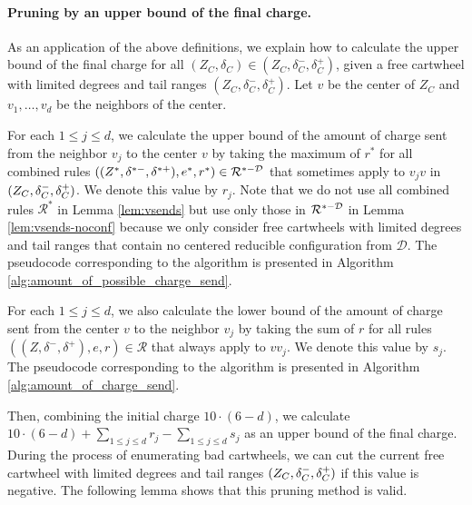 \documentclass[10pt,a4paper]{article}
\begin{document}
\paragraph{Pruning by an upper bound of the final charge.}
As an application of the above definitions, we explain how to calculate the upper bound of the final charge for all $(Z_C, \delta_C) \in (Z_C, \delta_C^-, \delta_C^+)$, given a free cartwheel with limited degrees and tail ranges $(Z_C, \delta_C^-, \delta_C^+)$.
Let $v$ be the center of $Z_C$ and $v_1, \ldots, v_d$ be the neighbors of the center.

For each $1 \leq j \leq d$, we calculate the upper bound of the amount of charge sent from the neighbor $v_j$ to the center $v$ by taking the maximum of $r^*$ for all combined rules $((Z^*, \delta^{*-}, \delta^{*+}), e^*, r^*) \in \mathcal{R}^{*-\mathcal{D}}$ that sometimes apply to $v_jv$ in $(Z_C, \delta_C^-, \delta_C^+)$.
We denote this value by $r_j$.
Note that we do not use all combined rules $\mathcal{R}^*$ in Lemma \ref{lem:vsends} but use only those in $\mathcal{R}^{*-\mathcal{D}}$ in Lemma \ref{lem:vsends-noconf} because we only consider free cartwheels with limited degrees and tail ranges that contain no centered reducible configuration from $\mathcal{D}$.
The pseudocode corresponding to the algorithm is presented in Algorithm \ref{alg:amount_of_possible_charge_send}.

For each $1 \leq j \leq d$, we also calculate the lower bound of the amount of charge sent from the center $v$ to the neighbor $v_j$ by taking the sum of $r$ for all rules $((Z, \delta^-, \delta^+), e, r) \in \mathcal{R}$ that always apply to $vv_j$.
We denote this value by $s_j$.
The pseudocode corresponding to the algorithm is presented in Algorithm \ref{alg:amount_of_charge_send}.

Then, combining the initial charge $10 \cdot (6-d)$, we calculate $10 \cdot (6-d) + \sum_{1 \leq j \leq d} r_j - \sum_{1 \leq j \leq d} s_j$ as an upper bound of the final charge.
During the process of enumerating bad cartwheels, we can cut the current free cartwheel with limited degrees and tail ranges $(Z_C, \delta_C^-, \delta_C^+)$ if this value is negative.
The following lemma shows that this pruning method is valid.
\end{document}
